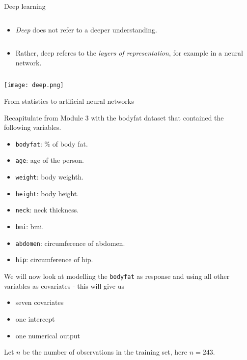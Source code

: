 \documentclass[10pt,ignorenonframetext,]{beamer}
\providecommand{\tightlist}{%
  \setlength{\itemsep}{0pt}\setlength{\parskip}{0pt}}
\begin{document}
\begin{frame}

\begin{block}{Deep learning}

\(~\)

\begin{itemize}
\tightlist
\item
  \emph{Deep} does not refer to a deeper understanding.
\end{itemize}

\(~\)

\begin{itemize}
\tightlist
\item
  Rather, deep referes to the \emph{layers of representation}, for
  example in a neural network.
\end{itemize}

\(~\)

\center

\texttt{[image: deep.png]}

\end{block}

\end{frame}

\begin{frame}[fragile]{From statistics to artificial neural networks}
\protect\hypertarget{from-statistics-to-artificial-neural-networks}{}

Recapitulate from Module 3 with the bodyfat dataset that contained the
following variables.

\begin{itemize}
\tightlist
\item
  \texttt{bodyfat}: \% of body fat.
\item
  \texttt{age}: age of the person.
\item
  \texttt{weight}: body weighth.
\item
  \texttt{height}: body height.
\item
  \texttt{neck}: neck thickness.
\item
  \texttt{bmi}: bmi.
\item
  \texttt{abdomen}: circumference of abdomen.
\item
  \texttt{hip}: circumference of hip.
\end{itemize}

\end{frame}

\begin{frame}[fragile]

We will now look at modelling the \texttt{bodyfat} as response and using
all other variables as covariates - this will give us

\begin{itemize}
\tightlist
\item
  seven covariates
\item
  one intercept
\item
  one numerical output
\end{itemize}

Let \(n\) be the number of observations in the training set, here
\(n=243\).

\end{frame}
\end{document}

